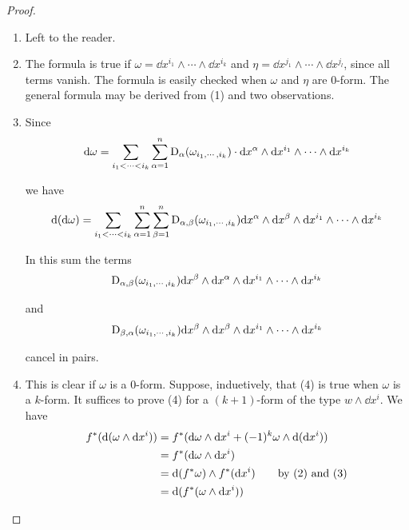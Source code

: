 \begin{proof}
    \begin{enumerate}[label=\upshape{(\arabic*)}]
        \item Left to the reader.
        \item The formula is true if $\omega = \dd x^{i_1}\wedge\cdots\wedge\dd x^{i_k}$ and 
            $\eta = \dd x^{j_1}\wedge\cdots\wedge\dd x^{j_l}$, since all terms vanish. The formula 
            is easily checked when $\omega$ and $\eta$ are 0-form. The general formula may be derived from (1)
            and two observations.
        \item Since 
            \begin{align*}
                \mathrm{d}\omega
                = \sum_{i_1<\cdots<i_k}^{}{\sum_{\alpha=1}^{n}{\mathrm{D}_\alpha(\omega_{i_1,\cdots,i_k})\cdot \mathrm{d} x^\alpha\wedge\mathrm{d} x^{i_1}\wedge\cdots\wedge\mathrm{d} x^{i_k}}}
            \end{align*} 

            we have 
            \begin{align*}
                \mathrm{d}(\mathrm{d}\omega)
                = \sum_{i_1<\cdots<i_k}^{}{\sum_{\alpha=1}^{n}{\sum_{\beta=1}^{n} \mathrm{D}_{\alpha,\beta}(\omega_{i_1,\cdots,i_k})\mathrm{d} x^\alpha\wedge\mathrm{d} x^\beta\wedge\mathrm{d} x^{i_1}\wedge\cdots\wedge\mathrm{d} x^{i_k}}}
            \end{align*}

            In this sum the terms 
            \begin{align*}
                \mathrm{D}_{\alpha,\beta}(\omega_{i_1,\cdots,i_k})\mathrm{d} x^\beta\wedge\mathrm{d} x^\alpha\wedge\mathrm{d} x^{i_1}\wedge\cdots\wedge\mathrm{d} x^{i_k}
            \end{align*}
            
            and 
            \begin{align*}
                \mathrm{D}_{\beta,\alpha}(\omega_{i_1,\cdots,i_k})\mathrm{d} x^\beta\wedge\mathrm{d} x^\beta\wedge\mathrm{d} x^{i_1}\wedge\cdots\wedge\mathrm{d} x^{i_k}
            \end{align*}

            cancel in pairs.
        \item This is clear if $\omega$ is a 0-form. Suppose, induetively, that
            (4) is true when $\omega$ is a $k$-form. It suffices to prove (4) for
            a $(k + 1)$-form of the type $w\wedge \dd x^i$. We have 
            \begin{align*}
                f^*(\mathrm{d}(\omega\wedge\mathrm{d} x^i))
                & = f^*(\mathrm{d}\omega\wedge\mathrm{d} x^i + (-1)^k\omega\wedge\mathrm{d}(\mathrm{d} x^i)) \\
                & = f^*(\mathrm{d}\omega\wedge \mathrm{d} x^i) \\
                & = \mathrm{d}(f^*\omega)\wedge f^*(\mathrm{d} x^i) \text{\qquad by (2) and (3)} \\
                & = \mathrm{d}(f^*(\omega\wedge\mathrm{d} x^i))
            \end{align*}
    \end{enumerate}
\end{proof}


